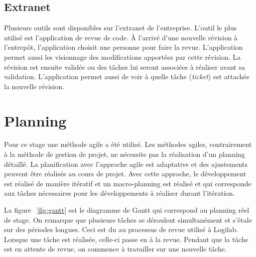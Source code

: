 \subsection{Extranet}
Plusieurs outils sont disponibles sur l'extranet de l'entreprise. L'outil le plus utilisé est l'application de revue de code. \`A l'arrivé d'une nouvelle révision à l'entrepôt, l'application choisit une personne pour faire la revue. L'application permet aussi les visionnage des modifications apportées par cette révision. La révision est ensuite validée ou des tâches lui seront associées à réaliser avant sa validation. L'application permet aussi de voir à quelle tâche (\textit{ticket}) est attachée la nouvelle révision.   

\section{Planning}
Pour ce stage une méthode agile a été utilisé. Les méthodes agiles, contrairement à la méthode de gestion de projet, ne nécessite pas la réalisation d'un planning détaillé. La planification avec l'approche agile est adaptative et des ajustements peuvent être réalisés au cours de projet. Avec cette approche, le développement est réalisé de manière itératif et un macro-planning est réalisé et qui corresponde aux tâches nécessaires pour les développements à réaliser durant l'itération. 

La figure ~\ref{fig:gantt} est le diagramme de Gantt qui correspond au planning réel de stage. On remarque que plusieurs tâches se déroulent simultanément et s'étale sur des périodes longues. Ceci est du au processus de revue utilisé à Logilab. Lorsque une tâche est réalisée, celle-ci passe en à la revue. Pendant que la tâche est en attente de revue, on commence à travailler sur une nouvelle tâche.

